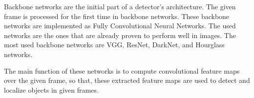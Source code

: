\documentclass{article}
\begin{document}
\setlength{\parindent}{6ex}

\indent

Backbone networks are the initial part of a detector's architecture.
The given frame is processed for the first time in backbone networks.
These backbone networks are implemented as Fully Convolutional Neural
Networks. The used networks are the ones that are already proven to perform 
well in images. The most used backbone networks are VGG, ResNet, DarkNet, 
and Hourglass networks.
\indent

The main function of these networks is to compute convolutional feature maps
over the given frame, so that, these extracted feature maps are used to detect 
and localize objects in given frames.
\end{document}
